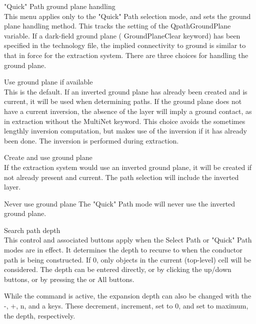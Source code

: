 \begin{description}
\item{\cb "Quick" Path ground plane handling}\\
This menu applies only to the {\cb "Quick" Path} selection mode, and
sets the ground plane handling method.  This tracks the setting of the
{\et QpathGroundPlane} variable.  If a dark-field ground plane ({\et
GroundPlaneClear} keyword) has been specified in the technology file,
the implied connectivity to ground is similar to that in force for the
extraction system.  There are three choices for handling the ground
plane.

\begin{description}
\item{\cb Use ground plane if available}\\
This is the default.  If an inverted ground plane has already been
created and is current, it will be used when determining paths.  If
the ground plane does not have a current inversion, the absence of the
layer will imply a ground contact, as in extraction without the {\et
MultiNet} keyword.  This choice avoids the sometimes lengthly
inversion computation, but makes use of the inversion if it has
already been done.  The inversion is performed during extraction.

\item{\cb Create and use ground plane}\\
If the extraction system would use an inverted ground plane, it will
be created if not already present and current.  The path selection
will include the inverted layer.

\item{\cb Never use ground plane}
The {\cb "Quick" Path} mode will never use the inverted ground plane.
\end{description}

\item{\cb Search path depth}\\
This control and associated buttons apply when the {\cb Select Path}
or {\cb "Quick" Path} modes are in effect.  It determines the depth to
recurse to when the conductor path is being constructed.  If 0, only
objects in the current (top-level) cell will be considered.  The depth
can be entered directly, or by clicking the up/down buttons, or by
pressing the {} or {\cb All} buttons.

While the command is active, the expansion depth can also be changed
with the {\kb -}, {\kb +}, {\kb n}, and {\kb a} keys.  These
decrement, increment, set to 0, and set to maximum, the depth,
respectively.


\end{description}

